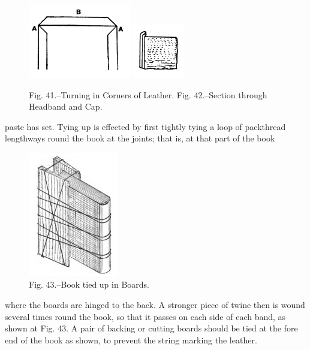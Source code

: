 \documentclass[twoside]{book}
\begin{document}
	\begin{figure}[h]
		\centering
		\includegraphics[width=0.4\textwidth]{Figures/_041.png}
		\includegraphics[width=0.2\textwidth]{Figures/_042.png}
		\caption*{
			Fig. 41.--Turning in Corners of Leather.
			Fig. 42.--Section through Headband and Cap.
		}
	\end{figure}
paste has set. Tying up is effected by first tightly
tying a loop of packthread lengthways round the
book at the joints; that is, at that part of the book
	\begin{figure}[h]
		\centering
		\includegraphics[width=0.35\textwidth]{Figures/_043.png}
		\caption*{Fig. 43.--Book tied up in Boards.}
	\end{figure}
where the boards are hinged to the back. A
stronger piece of twine then is wound several times
round the book, so that it passes on each side of
each band, as shown at Fig. 43. A pair of backing
or cutting boards should be tied at the fore end of
\pagebreak
the book as shown, to prevent the string marking
the leather.
\end{document}
